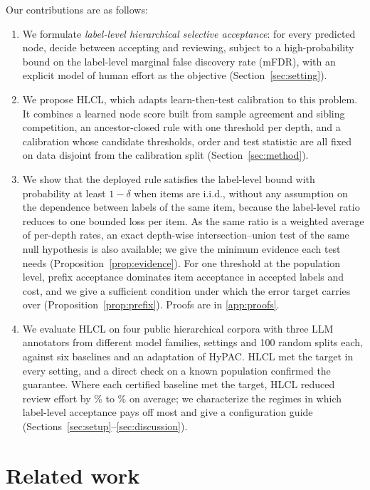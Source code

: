 \documentclass[preprint,12pt]{elsarticle}
\theoremstyle{definition}
\newcommand{\hlcl}{\textup{\textsc{HLCL}}}
\begin{document}
Our contributions are as follows:
\begin{enumerate}
  \item We formulate \emph{label-level hierarchical selective acceptance}: for
  every predicted node, decide between accepting and reviewing, subject to a
  high-probability bound on the label-level marginal false discovery rate
  (mFDR), with an explicit model of human effort as the objective
  (Section~\ref{sec:setting}).
  \item We propose \hlcl{}, which adapts learn-then-test calibration to this
  problem. It combines a learned node score built from sample agreement and
  sibling competition, an ancestor-closed rule with one threshold per depth, and
  a calibration whose candidate thresholds, order and test statistic are all
  fixed on data disjoint from the calibration split (Section~\ref{sec:method}).
  \item We show that the deployed rule satisfies the label-level bound with
  probability at least $1-\delta$ when items are i.i.d., without any assumption
  on the dependence between labels of the same item, because the label-level
  ratio reduces to one bounded loss per item. As the same ratio is a weighted
  average of per-depth rates, an exact depth-wise intersection--union test of
  the same null hypothesis is also available; we give the minimum evidence each
  test needs (Proposition~\ref{prop:evidence}). For one threshold at the
  population level, prefix acceptance dominates item acceptance in accepted
  labels and cost, and we give a sufficient condition under which the error
  target carries over (Proposition~\ref{prop:prefix}). Proofs are in
  \ref{app:proofs}.
  \item We evaluate \hlcl{} on four public hierarchical corpora with three LLM
  annotators from different model families,  settings and
  100 random splits each, against six baselines and an adaptation of HyPAC.
  \hlcl{} met the target in every setting, and a direct check on a known
  population confirmed the guarantee. Where each certified baseline met the
  target, \hlcl{} reduced review effort by \% to
  \% on average; we characterize the regimes in which
  label-level acceptance pays off most and give a configuration guide
  (Sections~\ref{sec:setup}--\ref{sec:discussion}).
\end{enumerate}

\section{Related work}
\label{sec:related}
\end{document}
